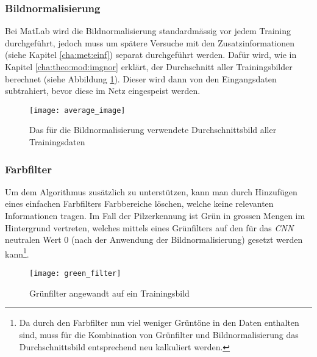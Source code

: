 \subsubsection{Bildnormalisierung}
Bei MatLab wird die Bildnormalisierung standardmässig vor jedem Training durchgeführt, jedoch muss um spätere Versuche mit den Zusatzinformationen (siehe Kapitel \ref{cha:met:einf}) separat durchgeführt werden. Dafür wird, wie in Kapitel \ref{cha:theo:mod:imgnor} erklärt, der Durchschnitt aller Trainingsbilder berechnet (siehe Abbildung \ref{img:img_norm}). Dieser wird dann von den Eingangsdaten subtrahiert, bevor diese im Netz eingespeist werden.

\begin{figure}[h]
	\centering
	\texttt{[image: average\_image]}
	\caption[Durchschnittsbild für Bildnormalisierung]{Das für die Bildnormalisierung verwendete Durchschnittsbild aller Trainingsdaten}
	\label{img:img_norm}
\end{figure}


\subsubsection{Farbfilter}\label{cha:met:gf}
Um dem Algorithmus zusätzlich zu unterstützen, kann man durch Hinzufügen eines einfachen Farbfilters Farbbereiche löschen, welche keine relevanten Informationen tragen. Im Fall der Pilzerkennung ist Grün in grossen Mengen im Hintergrund vertreten, welches mittels eines Grünfilters auf den für das \textit{CNN} neutralen Wert 0 (nach der Anwendung der Bildnormalisierung) gesetzt werden kann\footnote{Da durch den Farbfilter nun viel weniger Grüntöne in den Daten enthalten sind, muss für die Kombination von Grünfilter und Bildnormalisierung das Durchschnittsbild entsprechend neu kalkuliert werden.}.

\begin{figure}[h]
	\centering
	\texttt{[image: green\_filter]}
	\caption[Beispiel Grünfilter]{Grünfilter angewandt auf ein Trainingsbild\footnotemark}
	\label{img:green_filter}
\end{figure}


